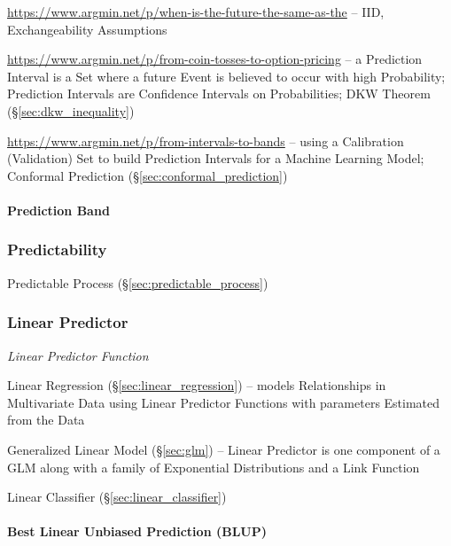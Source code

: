 \url{https://www.argmin.net/p/when-is-the-future-the-same-as-the} -- IID,
Exchangeability Assumptions

\url{https://www.argmin.net/p/from-coin-tosses-to-option-pricing} -- a
Prediction Interval is a Set where a future Event is believed to occur with high
Probability; Prediction Intervals are Confidence Intervals on Probabilities; DKW
Theorem (\S\ref{sec:dkw_inequality})

\url{https://www.argmin.net/p/from-intervals-to-bands} -- using a Calibration
(Validation) Set to build Prediction Intervals for a Machine Learning Model;
\fist Conformal Prediction (\S\ref{sec:conformal_prediction})



\paragraph{Prediction Band}\label{sec:prediction_band}\hfill



\subsubsection{Predictability}\label{sec:predictability}

\fist Predictable Process (\S\ref{sec:predictable_process})



\subsubsection{Linear Predictor}\label{sec:linear_predictor}

\emph{Linear Predictor Function}

\fist Linear Regression (\S\ref{sec:linear_regression}) -- models Relationships
in Multivariate Data using Linear Predictor Functions with parameters Estimated
from the Data

\fist Generalized Linear Model (\S\ref{sec:glm}) -- Linear Predictor is one
component of a GLM along with a family of Exponential Distributions and a Link
Function

\fist Linear Classifier (\S\ref{sec:linear_classifier})



\paragraph{Best Linear Unbiased Prediction (BLUP)}\label{sec:blup}\hfill

